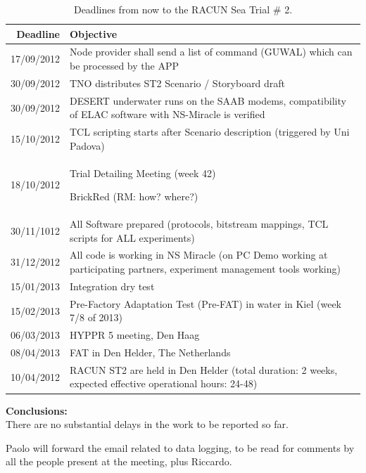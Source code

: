 \documentclass[11pt,journal,draftclsnofoot,onecolumn,twoside,letterpaper]{IEEEtran}
\newcommand{\RM}[1]{\begin{color}{BrickRed} (RM: #1) \end{color}}
\theoremstyle{definition} \newtheorem{definition}[]{Definition}
\theoremstyle{theorem} \newtheorem{theorem}[]{Theorem}
\begin{document}
\begin{table}[t]
  \centering
  \caption{Deadlines from now to the RACUN Sea Trial \# 2.}
  \label{tab:deadlines_ST2}
  \begin{tabular}{|r|p{14cm}|}
    \hline
    Deadline  &  Objective \\
    \hline \hline
    17/09/2012  &  Node provider shall send a list of command (GUWAL) which can be processed by the APP \\
    30/09/2012  &  TNO distributes ST2 Scenario / Storyboard draft \\
    30/09/2012  &  DESERT underwater runs on the SAAB modems, compatibility of ELAC software with NS-Miracle is                                          		verified \\
    15/10/2012  &  TCL scripting starts after Scenario description (triggered by Uni Padova)\\
    18/10/2012  &  Trial Detailing Meeting (week 42) \RM{how? where?} \\
    30/11/1012  &  All Software prepared (protocols, bitstream mappings, TCL scripts for ALL experiments) \\
    31/12/2012  &  All code is working in NS Miracle (on PC Demo working at participating partners, experiment 			management tools working) \\
    15/01/2013  &  Integration dry test \\
    15/02/2013  &  Pre-Factory Adaptation Test (Pre-FAT) in water in Kiel (week 7/8 of 2013) \\
    06/03/2013  &  HYPPR 5 meeting, Den Haag \\
    08/04/2013  &  FAT in Den Helder, The Netherlands \\
    10/04/2012  &  RACUN ST2 are held in Den Helder (total duration: 2 weeks, expected effective operational 			hours: 24-48)\\
    \hline
  \end{tabular}
\end{table}



{\bf Conclusions:} \\
There are no substantial delays in the work to be reported so far.

Paolo will forward the email related to data logging, to be read for comments by all the people present at the meeting, plus Riccardo.



\newpage

\end{document}
